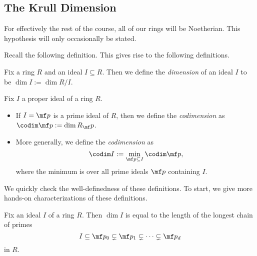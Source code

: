 \subsection{The Krull Dimension}
\begin{warn}
	For effectively the rest of the course, all of our rings will be Noetherian. This hypothesis will only occasionally be stated.
\end{warn}
Recall the following definition.
\krulldimdef*
\noindent This gives rise to the following definitions.
\begin{definition}
	Fix a ring $R$ and an ideal $I\subseteq R$. Then we define the \textit{dimension} of an ideal $I$ to be $\dim I:=\dim R/I$.
\end{definition}
\begin{definition}[Codimension]
	Fix $I$ a proper ideal of a ring $R$.
	\begin{itemize}
		\item If $I=\mf p$ is a prime ideal of $R$, then we define the \textit{codimension} as $\codim\mf p:=\dim R_\mf p$.
		\item More generally, we define the \textit{codimension} as
		\[\codim I:=\min_{\mf p\subseteq I}\codim\mf p,\]
		where the minimum is over all prime ideals $\mf p$ containing $I$.
	\end{itemize}
\end{definition}
We quickly check the well-definedness of these definitions. To start, we give more hands-on characterizations of these definitions.
\begin{lemma} \label{lem:dimisascend}
	Fix an ideal $I$ of a ring $R$. Then $\dim I$ is equal to the length of the longest chain of primes
	\[I\subseteq\mf p_0\subsetneq\mf p_1\subsetneq\cdots\subsetneq\mf p_d\]
	in $R$.
\end{lemma}
